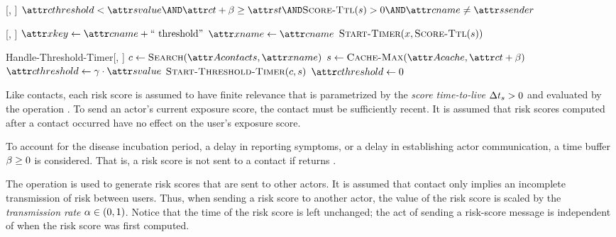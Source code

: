 %
\begin{function}{\nShouldReceive}[\vContact, \vScore]
    \State \Return $\aContactThreshold < \aScoreValue \AND \aContactTime + \pTimeBuffer \geq \aScoreTime \AND \cScoreTtl[\vScore] > 0 \AND \aContactName \notEquals \aScoreSender$
\end{function}
%
%
\begin{function}{\nStartThresholdTimer}[\vContact, \vScore]
    \State $\aTimerKey \assign \aContactName + $
    \State $\aTimerName \assign \aContactName$
    \State $\cStartTimer[\vTimer, \cScoreTtl[\vScore]]$
\end{function}
%
\begin{function}{Handle-Threshold-Timer}[\vActor, \vTimer]
    \State $\vContact \assign \cSearch[\aActorContacts, \aTimerName]$
    \If{$\vContact \notEquals \nil$}
    	\State $\vScore \assign \cCacheMax[\aActorCache, \aContactTime + \pTimeBuffer]$
    	\If{$\vScore \notEquals \nil \AND \cScoreTtl[\vScore] > 0$}
    		\State $\aContactThreshold \assign \pSendCoeff \cdot \aScoreValue$
    		\State $\cStartThresholdTimer[\vContact, \vScore]$
    	\Else
    		\State $\aContactThreshold {}$
    	\EndIf
    \EndIf
\end{function}
%
Like contacts, each risk score is assumed to have finite relevance that is parametrized by the \emph{score time-to-live} ${\Delta}t_s > 0$ and evaluated by the operation . To send an actor's current exposure score, the contact must be sufficiently recent. It is assumed that risk scores computed after a contact occurred have no effect on the user's exposure score.

To account for the disease incubation period, a delay in reporting symptoms, or a delay in establishing actor communication, a time buffer $\pTimeBuffer {}$ is considered. That is, a risk score is not sent to a contact if  returns \false.

The  operation is used to generate risk scores that are sent to other actors. It is assumed that contact only implies an incomplete transmission of risk between users. Thus, when sending a risk score to another actor, the value of the risk score is scaled by the \emph{transmission rate} $\alpha \in (0, 1)$. Notice that the time of the risk score is left unchanged; the act of sending a risk-score message is independent of when the risk score was first computed.

